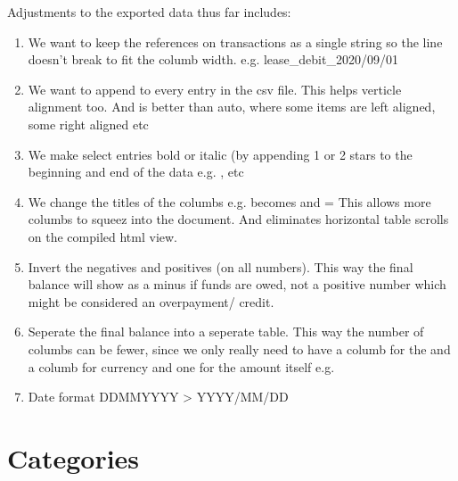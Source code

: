 \documentclass[letterpaper,10pt,openany,oneside,russian]{sphinxmanual}
\begin{document}
\sphinxAtStartPar
Adjustments to the exported data thus far includes:
\begin{enumerate}
%
\item {} 
\sphinxAtStartPar
We want to keep the references on transactions as a single string so the line doesn’t break to fit the columb width. e.g. lease\_debit\_2020/09/01

\item {} 
\sphinxAtStartPar
We want to append  to every entry in the csv file. This helps verticle alignment too. And is better than auto, where some items are left aligned, some right aligned etc

\item {} 
\sphinxAtStartPar
We make select entries bold or italic (by appending 1 or 2 stars to the beginning and end of the data e.g. ,  etc

\item {} 
\sphinxAtStartPar
We change the titles of the columbs e.g.  becomes  and  =  \sphinxhyphen{} This allows more columbs to squeez into the document. And eliminates horizontal table scrolls on the compiled html view.

\item {} 
\sphinxAtStartPar
Invert the negatives and positives (on all numbers). This way the final balance will show as a minus if funds are owed, not a positive number which might be considered an overpayment/ credit.

\item {} 
\sphinxAtStartPar
Seperate the final balance into a seperate table. This way the number of columbs can be fewer, since we only really need to have a columb for the  and a columb for currency  and one for the amount itself e.g. 

\item {} 
\sphinxAtStartPar
Date format DD\sphinxhyphen{}MM\sphinxhyphen{}YYYY \textgreater{} YYYY/MM/DD

\end{enumerate}


\chapter{Categories}
\label{\detokenize{categories:categories}}\label{\detokenize{categories::doc}}
\end{document}
